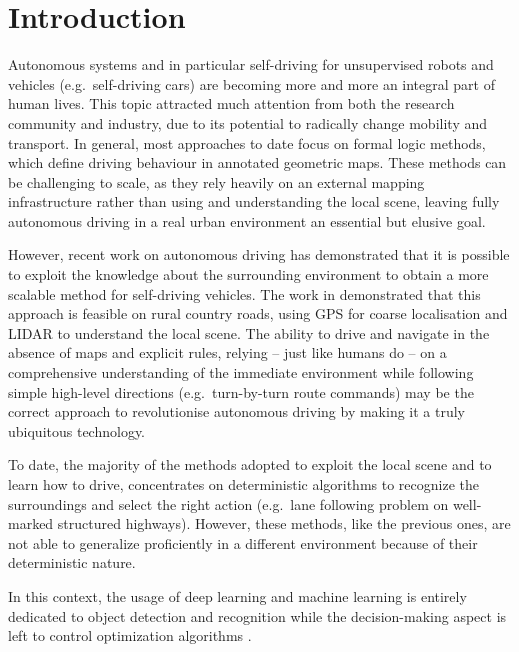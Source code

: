 \chapter{Introduction} \label{ch:ch1}

Autonomous systems and in particular self-driving for unsupervised robots and vehicles (e.g.\ self-driving cars) are becoming more and more an integral part of human lives. This topic attracted much attention from both the research community and industry, due to its potential to radically change mobility and transport. In general, most approaches to date focus on formal logic methods, which define driving behaviour in annotated geometric maps. These methods can be challenging to scale, as they rely heavily on an external mapping infrastructure rather than using and understanding the local scene, leaving fully autonomous driving in a real urban environment an essential but elusive goal.

However, recent work on autonomous driving has demonstrated that it is possible to exploit the knowledge about the surrounding environment to obtain a more scalable method for self-driving vehicles. The work in \cite{ort2018autonomous} demonstrated that this approach is feasible on rural country roads, using GPS for coarse localisation and LIDAR to understand the local scene. The ability to drive and navigate in the absence of maps and explicit rules, relying – just like humans do – on a comprehensive understanding of the immediate environment while following simple high-level directions (e.g.\ turn-by-turn route commands) may be the correct approach to revolutionise autonomous driving by making it a truly ubiquitous technology.

To date, the majority of the methods adopted to exploit the local scene and to learn how to drive, concentrates on deterministic algorithms to recognize the surroundings and select the right action (e.g.\ lane following problem on well-marked structured highways). However, these methods, like the previous ones, are not able to generalize proficiently in a different environment because of their deterministic nature.

In this context, the usage of deep learning and machine learning is entirely dedicated to object detection and recognition while the decision-making aspect is left to control optimization algorithms \cite{huval2015empirical}.

